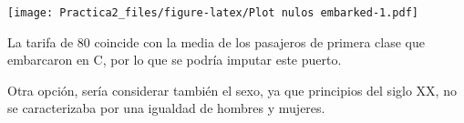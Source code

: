 \documentclass[]{article}
\newenvironment{Shaded}{\begin{snugshade}}{\end{snugshade}}
\newcommand{\KeywordTok}[1]{\textcolor[rgb]{0.13,0.29,0.53}{\textbf{#1}}}
\newcommand{\DataTypeTok}[1]{\textcolor[rgb]{0.13,0.29,0.53}{#1}}
\newcommand{\DecValTok}[1]{\textcolor[rgb]{0.00,0.00,0.81}{#1}}
\newcommand{\StringTok}[1]{\textcolor[rgb]{0.31,0.60,0.02}{#1}}
\newcommand{\OperatorTok}[1]{\textcolor[rgb]{0.81,0.36,0.00}{\textbf{#1}}}
\newcommand{\NormalTok}[1]{#1}
\begin{document}
\begin{Shaded}
\end{Shaded}

\texttt{[image: Practica2\_files/figure-latex/Plot nulos embarked-1.pdf]}

La tarifa de 80 coincide con la media de los pasajeros de primera clase
que embarcaron en C, por lo que se podría imputar este puerto.

\begin{Shaded}
\end{Shaded}

Otra opción, sería considerar también el sexo, ya que principios del
siglo XX, no se caracterizaba por una igualdad de hombres y mujeres.
\end{document}
